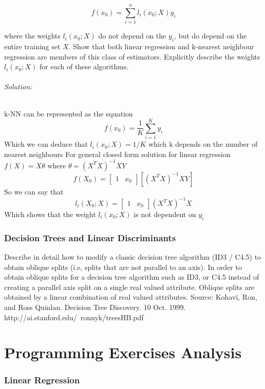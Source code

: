 \documentclass{article}
\begin{document}
$$f(x_0) =\displaystyle\sum\limits_{i=1}^n l_i(x_0; X)y_i
$$

where the weights $l_i(x_0;X)$ do not depend on the $y_i$, but do depend on the entire training set $X$. Show that
both linear regression and k-nearest neighbour regression are members of this class of estimators. 
\newline 
Explicitly describe the weights $l_i(x_0;X)$ for each of these algorithms.

\paragraph {Solution:}
k-NN can be represented as the equation 
$$f(x_0) = \frac{1}{K} \displaystyle\sum\limits_{i =1}^K y_i
$$
Which we can deduce that $l_i (x_0; X)  = 1/K$ which k depends on the number of nearest neighbours 
\newline
For general closed form solution for linear regression
\newline  
 $ f(X) = X\theta  $  where $ \theta = (X^TX)^{-1}XY $
 $$f(X_0) =[\begin{matrix} 1 & x_0 \end{matrix} ][(X^TX)^{-1}XY]$$ 
 So we can say that 
 $$l_i(X_0;X) = [\begin{matrix} 1 & x_0 \end{matrix} ] (X^TX)^{-1}X $$ 
 Which shows that the weight $l_i(x_0;X)$ is not dependent on $y_i$ 
 
 \section{Decision Trees and Linear Discriminants}
 Describe in detail how to modify a classic decision tree algorithm (ID3 / C4.5) to obtain oblique splits (i.e,
splits that are not parallel to an axis).
In order to obtain oblique splits for a decision tree algorithm such as ID3, or C4.5 instead of creating a parallel axis split on a single real valued attribute. Oblique splits are obtained by a linear combination of real valued attributes. 
Source: Kohavi, Ron, and Ross Quinlan. Decision Tree Discovery.  10 Oct. 1999. http://ai.stanford.edu/~ronnyk/treesHB.pdf

\part{Programming Exercises Analysis}
\section {Linear Regression} 
\end{document}
